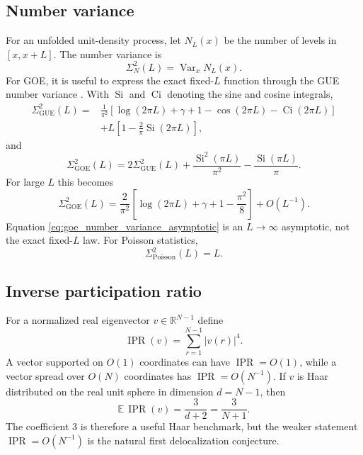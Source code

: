 \documentclass[11pt]{amsart}
\numberwithin{equation}{section}
\theoremstyle{plain}
\theoremstyle{definition}
\theoremstyle{remark}
\newcommand{\IPR}{\operatorname{IPR}}
\newcommand{\GOE}{\mathrm{GOE}}
\newcommand{\GUE}{\mathrm{GUE}}
\newcommand{\Poisson}{\mathrm{Poisson}}
\newcommand{\Var}{\operatorname{Var}}
\begin{document}
\subsection{Number variance}
\label{subsec:number_variance}

For an unfolded unit-density process, let $N_L(x)$ be the number of levels in $[x,x+L]$.  The number variance is
\begin{equation}
\Sigma_N^2(L)=\Var_x N_L(x).
\label{eq:number_variance_definition}
\end{equation}
For GOE, it is useful to express the exact fixed-$L$ function through the GUE number variance \cite{Mehta2004,BGS1984}.  With $\operatorname{Si}$ and $\operatorname{Ci}$ denoting the sine and cosine integrals,
\begin{align}
\Sigma_{\GUE}^2(L)
={}&\frac{1}{\pi^2}
\left[
\log(2\pi L)+\gamma+1-\cos(2\pi L)-\operatorname{Ci}(2\pi L)
\right]
\label{eq:gue_number_variance_first}\\
&+L\left[1-\frac{2}{\pi}\operatorname{Si}(2\pi L)\right],
\label{eq:gue_number_variance_second}
\end{align}
and
\begin{equation}
\Sigma_{\GOE}^2(L)
=
2\Sigma_{\GUE}^2(L)
+
\frac{\operatorname{Si}^2(\pi L)}{\pi^2}
-
\frac{\operatorname{Si}(\pi L)}{\pi}.
\label{eq:goe_number_variance_exact}
\end{equation}
For large $L$ this becomes
\begin{equation}
\Sigma_{\GOE}^2(L)
=
\frac{2}{\pi^2}
\left[
\log(2\pi L)+\gamma+1-\frac{\pi^2}{8}
\right]
+O(L^{-1}).
\label{eq:goe_number_variance_asymptotic}
\end{equation}
Equation \eqref{eq:goe_number_variance_asymptotic} is an $L\to\infty$ asymptotic, not the exact fixed-$L$ law.  For Poisson statistics,
\begin{equation}
\Sigma_{\Poisson}^2(L)=L.
\label{eq:poisson_number_variance}
\end{equation}

\subsection{Inverse participation ratio}
\label{subsec:ipr}

For a normalized real eigenvector $v\in\mathbb R^{N-1}$ define
\begin{equation}
\IPR(v)=\sum_{r=1}^{N-1}|v(r)|^4.
\label{eq:ipr_definition}
\end{equation}
A vector supported on $O(1)$ coordinates can have $\IPR=O(1)$, while a vector spread over $O(N)$ coordinates has $\IPR=O(N^{-1})$.  If $v$ is Haar distributed on the real unit sphere in dimension $d=N-1$, then
\begin{equation}
\mathbb E\,\IPR(v)=\frac{3}{d+2}=\frac{3}{N+1}.
\label{eq:haar_ipr}
\end{equation}
The coefficient $3$ is therefore a useful Haar benchmark, but the weaker statement $\IPR=O(N^{-1})$ is the natural first delocalization conjecture.
\end{document}
